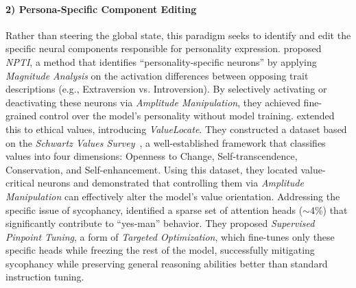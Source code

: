 \documentclass[11pt,letterpaper]{mystyle}
\begin{document}
  \paragraph{2) Persona-Specific Component Editing}
  Rather than steering the global state, this paradigm seeks to identify and edit the specific neural components responsible for personality expression.
  \citet{deng2025neuron} proposed \textit{NPTI}, a method that identifies ``personality-specific neurons'' by applying \textit{Magnitude Analysis} on the activation differences between opposing trait descriptions (e.g., Extraversion vs. Introversion). By selectively activating or deactivating these neurons via \textit{Amplitude Manipulation}, they achieved fine-grained control over the model's personality without model training.
  \citet{su-etal-2025-understanding} extended this to ethical values, introducing \textit{ValueLocate}. They constructed a dataset based on the \textit{Schwartz Values Survey}~\citep{schwartz1992universals}, a well-established framework that classifies values into four dimensions: Openness to Change, Self-transcendence, Conservation, and Self-enhancement. Using this dataset, they located value-critical neurons and demonstrated that controlling them via \textit{Amplitude Manipulation} can effectively alter the model's value orientation.
  Addressing the specific issue of sycophancy, \citet{chen2024from} identified a sparse set of attention heads ($\sim$4\%) that significantly contribute to ``yes-man'' behavior. They proposed \textit{Supervised Pinpoint Tuning}, a form of \textit{Targeted Optimization}, which fine-tunes only these specific heads while freezing the rest of the model, successfully mitigating sycophancy while preserving general reasoning abilities better than standard instruction tuning.
  
\end{document}
